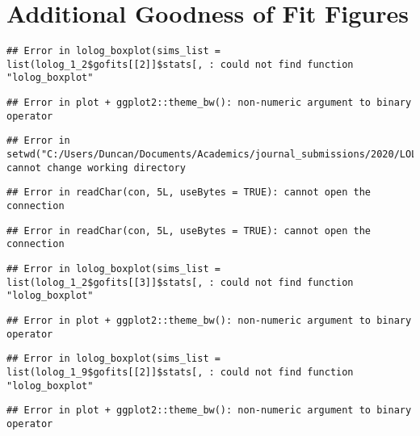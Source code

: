 \documentclass[
]{statsoc}
\begin{document}
\appendix
\appendixpage
\addappheadtotoc

\section{Additional Goodness of Fit Figures}\label{app:GOF}

\begin{verbatim}
## Error in lolog_boxplot(sims_list = list(lolog_1_2$gofits[[2]]$stats[, : could not find function "lolog_boxplot"
\end{verbatim}

\begin{verbatim}
## Error in plot + ggplot2::theme_bw(): non-numeric argument to binary operator
\end{verbatim}

\begin{verbatim}
## Error in setwd("C:/Users/Duncan/Documents/Academics/journal_submissions/2020/LOLOG_Catalog/1_18_OfficeLayout"): cannot change working directory
\end{verbatim}

\begin{verbatim}
## Error in readChar(con, 5L, useBytes = TRUE): cannot open the connection
\end{verbatim}

\begin{verbatim}
## Error in readChar(con, 5L, useBytes = TRUE): cannot open the connection
\end{verbatim}

\begin{verbatim}
## Error in lolog_boxplot(sims_list = list(lolog_1_2$gofits[[3]]$stats[, : could not find function "lolog_boxplot"
\end{verbatim}

\begin{verbatim}
## Error in plot + ggplot2::theme_bw(): non-numeric argument to binary operator
\end{verbatim}

\begin{verbatim}
## Error in lolog_boxplot(sims_list = list(lolog_1_9$gofits[[2]]$stats[, : could not find function "lolog_boxplot"
\end{verbatim}

\begin{verbatim}
## Error in plot + ggplot2::theme_bw(): non-numeric argument to binary operator
\end{verbatim}
\end{document}
